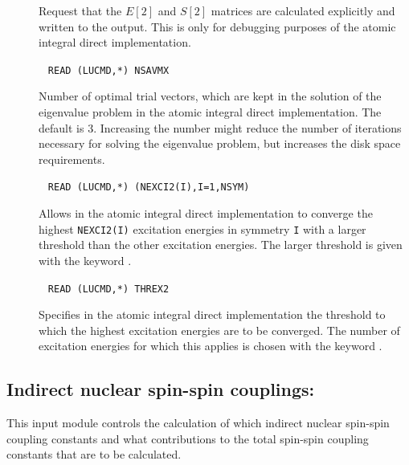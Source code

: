 \begin{description}
\item[] Request that the $E[2]$ and $S[2]$ matrices are
calculated explicitly and written to the output. This is only for
debugging purposes of the atomic integral direct implementation.

\item[]\verb| |\newline
\verb|READ (LUCMD,*) NSAVMX|

Number of optimal trial vectors, which are kept in the solution of the
eigenvalue problem in the atomic integral direct implementation. The
default is 3. Increasing the number might reduce the number of
iterations necessary for solving the eigenvalue problem, but increases
the disk space requirements.

\item[]\verb| |\newline
\verb|READ (LUCMD,*) (NEXCI2(I),I=1,NSYM)|

Allows in the atomic integral direct implementation to converge the
highest \verb|NEXCI2(I)| excitation energies in symmetry \verb|I| with
a larger threshold than the other excitation energies. The larger
threshold is given with the keyword .

\item[]\verb| |\newline
\verb|READ (LUCMD,*) THREX2|

Specifies in the atomic integral direct implementation the threshold to
which the highest excitation energies are to be converged. The number
of excitation energies for which this applies is chosen with the
keyword .

\end{description}

\subsection{Indirect nuclear spin-spin couplings:
}\label{sec:spin-s}

This input module controls the calculation of which indirect nuclear
spin-spin coupling constants and what contributions to the total
spin-spin coupling constants that are to be calculated.

